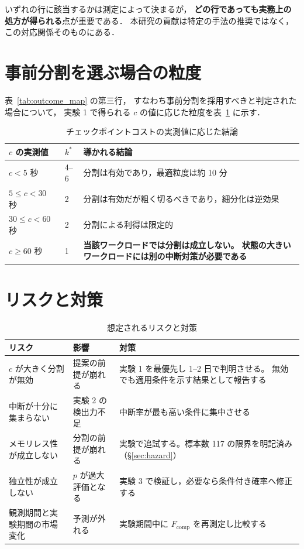 \documentclass[11pt,a4paper]{ltjsreport}
\newcommand{\Fcomp}{F_{\mathrm{comp}}}
\begin{document}
いずれの行に該当するかは測定によって決まるが，
\textbf{どの行であっても実務上の処方が得られる}点が重要である．
本研究の貢献は特定の手法の推奨ではなく，
この対応関係そのものにある．

\section{事前分割を選ぶ場合の粒度}

表~\ref{tab:outcome_map} の第三行，
すなわち事前分割を採用すべきと判定された場合について，
実験 1 で得られる $c$ の値に応じた粒度を表~\ref{tab:outcomes} に示す．

\begin{table}[htbp]
\centering
\caption{チェックポイントコストの実測値に応じた結論}
\label{tab:outcomes}
\small
\begin{tabularx}{\textwidth}{@{}llX@{}}
\toprule
$c$ の実測値 & $k^{*}$ & 導かれる結論 \\
\midrule
$c < 5$ 秒 & 4--6
  & 分割は有効であり，最適粒度は約 10 分 \\
\addlinespace
$5 \leq c < 30$ 秒 & 2
  & 分割は有効だが粗く切るべきであり，細分化は逆効果 \\
\addlinespace
$30 \leq c < 60$ 秒 & 2
  & 分割による利得は限定的 \\
\addlinespace
$c \geq 60$ 秒 & 1
  & \textbf{当該ワークロードでは分割は成立しない。
    状態の大きいワークロードには別の中断対策が必要である} \\
\bottomrule
\end{tabularx}
\end{table}

\section{リスクと対策}

\begin{table}[htbp]
\centering
\caption{想定されるリスクと対策}
\label{tab:risks}
\small
\begin{tabularx}{\textwidth}{@{}XXX@{}}
\toprule
リスク & 影響 & 対策 \\
\midrule
$c$ が大きく分割が無効
  & 提案の前提が崩れる
  & 実験 1 を最優先し 1--2 日で判明させる。
    無効でも適用条件を示す結果として報告する \\
\addlinespace
中断が十分に集まらない
  & 実験 2 の検出力不足
  & 中断率が最も高い条件に集中させる \\
\addlinespace
メモリレス性が成立しない
  & 分割の前提が崩れる
  & 実験で追試する。標本数 117 の限界を明記済み
    （\S\ref{sec:hazard}） \\
\addlinespace
独立性が成立しない
  & $p$ が過大評価となる
  & 実験 3 で検証し，必要なら条件付き確率へ修正する \\
\addlinespace
観測期間と実験期間の市場変化
  & 予測が外れる
  & 実験期間中に $\Fcomp$ を再測定し比較する \\
\bottomrule
\end{tabularx}
\end{table}
\end{document}
